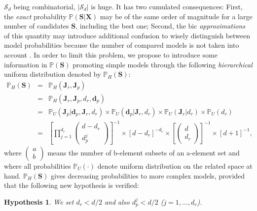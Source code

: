 \documentclass[12pt,a4paper]{report}
\newtheorem{hyp}{Hypothesis}
\begin{document}
	$\mathcal{S}_d$ being combinatorial, $|\mathcal{S}_d|$ is huge. It has two cumulated consequences: First, the {\it exact} probability $\mathbb{P}(\boldsymbol{S}|\boldsymbol{X})$ may be of the same order of magnitude for a large number of candidates  $\boldsymbol{S}$, including the best one; Second, the {\sc bic} {\it approximations} of this quantity may introduce additional confusion to wisely distinguish between model probabilities because the number of compared models is not taken into account \cite{massart2007concentration}. In order to limit this problem, we propose to introduce some information in $\mathbb{P}(\boldsymbol{S})$ promoting simple models through the following {\it hierarchical} uniform distribution denoted by $\mathbb{P}_H(\boldsymbol{S})$:
\begin{eqnarray}
\mathbb{P}_H(\boldsymbol{S}) & = & \mathbb{P}_H(\boldsymbol{J}_r,\boldsymbol{J}_p) \nonumber \\
 & = & \mathbb{P}_H(\boldsymbol{J}_r,\boldsymbol{J}_p,d_r,\boldsymbol{d}_p)  \nonumber \\
 & = & \mathbb{P}_U(\boldsymbol{J}_p|\boldsymbol{d}_p,\boldsymbol{J}_r,d_r) \times \mathbb{P}_U(\boldsymbol{d}_p|\boldsymbol{J}_r,d_r) \times \mathbb{P}_U(\boldsymbol{J}_r|d_r)\times \mathbb{P}_U(d_r)  \nonumber \\
 & = & \left[\prod_{j=1}^{d_r} \left(\begin{array}{c} d-d_r \\ d_p^j \end{array}\right) \right]^{-1} \times \left[d-d_r\right]^{-d_r} \times \left[\left(\begin{array}{c} d \\ d_r \end{array} \right)\right]^{-1} \times [d+1]^{-1}, \nonumber 
\end{eqnarray}
where $\left(\begin{array}{c} a \\ b \end{array}\right)$ means the number of b-element subsets of an a-element set and where all probabilities $\mathbb{P}_U(\cdot)$ denote uniform distribution on the related space at hand. $\mathbb{P}_H(\boldsymbol{S})$ gives decreasing probabilities to more complex models, provided that the following new hypothesis is verified:

\begin{hyp}\label{H5}
We set $d_r<d/2$ and also $d_p^j<d/2$ ($j=1,\ldots,d_r$).
\end{hyp}
\end{document}
